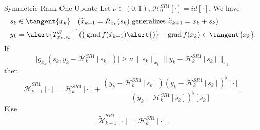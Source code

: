 \documentclass{beamer}
\begin{document}
\begin{frame}{Symmetric Rank One Update}
    Let $\nu \in (0,1)$, $\mathcal{H}^{SR1}_0 [\cdot] = id[\cdot]$. We have
    \begin{align*}
        & s_k \in \tangent{x_k} \quad (\widetilde{x}_{k+1} = R_{x_k}(s_k) \text{ generalizes } \widetilde{x}_{k+1} = x_k + s_k) \\
        & y_k = \alert{{T^{S}_{x_k, s_k}}^{-1} (} \operatorname{grad}f(\widetilde{x}_{k+1}) \alert{)} - \operatorname{grad}f(x_k) \in \tangent{x_k}.
    \end{align*}
    If
    \begin{equation*}
        \lvert g_{x_k}(s_k, y_k - \mathcal{H}^{SR1}_k[s_k]) \rvert \geq \nu \; \lVert s_k \rVert_{x_k} \lVert y_k - \mathcal{H}^{SR1}_k[s_k] \rVert_{x_k}
    \end{equation*}
    then
    \begin{equation*}
        \widetilde{\mathcal{H}}^{SR1}_{k+1} [\cdot] = \mathcal{H}^{SR1}_k [\cdot] + \frac{(y_k - \mathcal{H}^{SR1}_k [s_k]) (y_k - \mathcal{H}^{SR1}_k [s_k])^{\flat} [\cdot] }{(y_k - \mathcal{H}^{SR1}_k [s_k])^{\flat} [s_k]},
    \end{equation*}
    Else 
    \begin{equation*}
        \widetilde{\mathcal{H}}^{SR1}_{k+1} [\cdot] = \mathcal{H}^{SR1}_k [\cdot].
    \end{equation*}
\end{frame}
\end{document}

